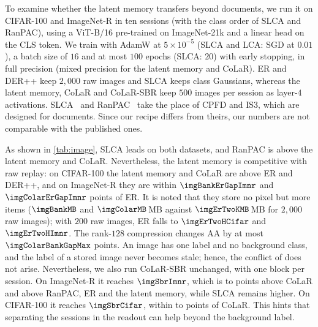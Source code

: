  To examine whether the latent memory transfers beyond documents, we run it on CIFAR-100 and ImageNet-R in ten sessions (with the class order of SLCA and RanPAC), using a ViT-B/16 pre-trained on ImageNet-21k and a linear head on the CLS token. We train with AdamW at $5{\times}10^{-5}$ (SLCA and LCA: SGD at $0.01$), a batch size of $16$ and at most $100$ epochs (SLCA: $20$) with early stopping, in full precision (mixed precision for the latent memory and CoLaR). ER and DER++ keep $2{,}000$ raw images and SLCA keeps class Gaussians, whereas the latent memory, CoLaR and CoLaR-SBR keep $500$ images per session as layer-$4$ activations. SLCA~\citep{zhang2023slca} and RanPAC~\citep{mcdonnell2023ranpac} take the place of CPFD and IS3, which are designed for documents. Since our recipe differs from theirs, our numbers are not comparable with the published ones.

 As shown in \cref{tab:image}, SLCA leads on both datasets, and RanPAC is above the latent memory and CoLaR. Nevertheless, the latent memory is competitive with raw replay: on CIFAR-100 the latent memory and CoLaR are above ER and DER++, and on ImageNet-R they are within $\imgBankErGapImnr$ and $\imgColarErGapImnr$ points of ER. It is noted that they store no pixel but more items ($\imgBankMB$ and $\imgColarMB$\,MB against $\imgErTwoKMB$\,MB for $2{,}000$ raw images); with $200$ raw images, ER falls to $\imgErTwoHCifar$ and $\imgErTwoHImnr$. The rank-$128$ compression changes AA by at most $\imgColarBankGapMax$ points. An image has one label and no background class, and the label of a stored image never becomes stale; hence, the conflict of  does not arise. Nevertheless, we also run CoLaR-SBR unchanged, with one block per session. On ImageNet-R it reaches $\imgSbrImnr$, which is \imgSbrMinusColarImnrMin{} to \imgSbrMinusColarImnrMax{} points above CoLaR and above RanPAC, ER and the latent memory, while SLCA remains higher. On CIFAR-100 it reaches $\imgSbrCifar$, within \imgSbrMinusColarCifarMin{} to \imgSbrMinusColarCifarMax{} points of CoLaR. This hints that separating the sessions in the readout can help beyond the background label.

